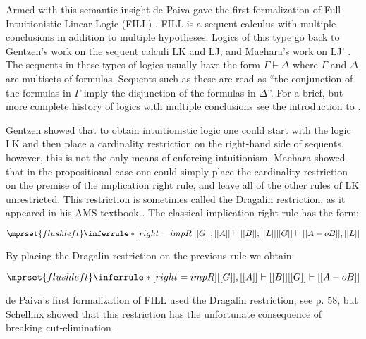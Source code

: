 Armed with this semantic insight de Paiva gave the first formalization
of Full Intuitionistic Linear Logic (FILL) \cite{dePaiva:1988}.  FILL
is a sequent calculus with multiple conclusions in addition to
multiple hypotheses.  Logics of this type go back to Gentzen's work on
the sequent calculi LK and LJ, and Maehara's work on LJ'
\cite{Maehara:1954,Takeuti:1975}.  The sequents in these types of
logics usually have the form $\Gamma \vdash \Delta$ where $\Gamma$ and
$\Delta$ are multisets of formulas.  Sequents such as these are read
as ``the conjunction of the formulas in $\Gamma$ imply the disjunction
of the formulas in $\Delta$''.  For a brief, but more complete history
of logics with multiple conclusions see the introduction to
\cite{dePaiva:2005}.

Gentzen showed that to obtain intuitionistic logic one could start
with the logic LK and then place a cardinality restriction on the
right-hand side of sequents, however, this is not the only means of
enforcing intuitionism.  Maehara showed that in the propositional case
one could simply place the cardinality restriction on the premise of
the implication right rule, and leave all of the other rules of LK
unrestricted.  This restriction is sometimes called the Dragalin
restriction, as it appeared in his AMS textbook \cite{Dragalin:1988}.
The classical implication right rule has the form:
\begin{center}
  \begin{math}
    $$\mprset{flushleft}
    \inferrule* [right=impR] {
      [[G]], [[A]] \vdash [[B]], [[L]]
    }{[[G]] \vdash [[A -o B]], [[L]]}
  \end{math}
\end{center}
By placing the Dragalin restriction on the previous rule we obtain:
\begin{center}
  \begin{math}
    $$\mprset{flushleft}
    \inferrule* [right=impR] {
      [[G]], [[A]] \vdash [[B]]
    }{[[G]] \vdash [[A -o B]]}
  \end{math}
\end{center}
de Paiva's first formalization of FILL used the Dragalin restriction,
see \cite{dePaiva:1988} p. 58, but Schellinx showed that this restriction has
the unfortunate consequence of breaking cut-elimination
\cite{Schellinx:1991}.

